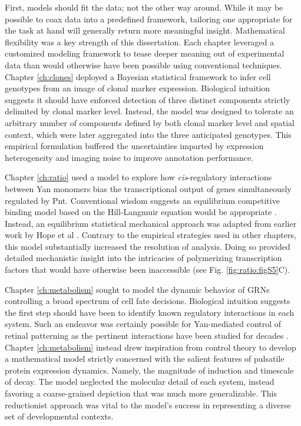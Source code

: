 First, models should fit the data; not the other way around. While it may be possible to coax data into a predefined framework, tailoring one appropriate for the task at hand will generally return more meaningful insight. Mathematical flexibility was a key strength of this dissertation. Each chapter leveraged a customized modeling framework to tease deeper meaning out of experimental data than would otherwise have been possible using conventional techniques. Chapter \ref{ch:clones} deployed a Bayesian statistical framework to infer cell genotypes from an image of clonal marker expression. Biological intuition suggests it should have enforced detection of three distinct components strictly delimited by clonal marker level. Instead, the model was designed to tolerate an arbitrary number of components defined by both clonal marker level and spatial context, which were later aggregated into the three anticipated genotypes. This empirical formulation buffered the uncertainties imparted by expression heterogeneity and imaging noise to improve annotation performance. 

Chapter \ref{ch:ratio} used a model to explore how \textit{cis}-regulatory interactions between Yan monomers bias the transcriptional output of genes simultaneously regulated by Pnt. Conventional wisdom suggests an equilibrium competitive binding model based on the Hill-Langmuir equation would be appropriate \cite{Gesztelyi2012}. Instead, an equilibrium statistical mechanical approach was adapted from earlier work by Hope et al \cite{Hope2017}. Contrary to the empirical strategies used in other chapters, this model substantially increased the resolution of analysis. Doing so provided detailed mechanistic insight into the intricacies of polymerizing transcription factors that would have otherwise been inaccessible (see Fig. \ref{fig:ratio:figS5}C). 

Chapter \ref{ch:metabolism} sought to model the dynamic behavior of GRNs controlling a broad spectrum of cell fate decisions. Biological intuition suggests the first step should have been to identify known regulatory interactions in each system. Such an endeavor was certainly possible for Yan-mediated control of retinal patterning as the pertinent interactions have been studied for decades \cite{Ready1976,Rebay1995,Rohrbaugh2002,Carthew2009}. Chapter \ref{ch:metabolism} instead drew inspiration from control theory to develop a mathematical model strictly concerned with the salient features of pulsatile protein expression dynamics. Namely, the magnitude of induction and timescale of decay. The model neglected the molecular detail of each system, instead favoring a coarse-grained depiction that was much more generalizable. This reductionist approach was vital to the model's success in representing a diverse set of developmental contexts. 


